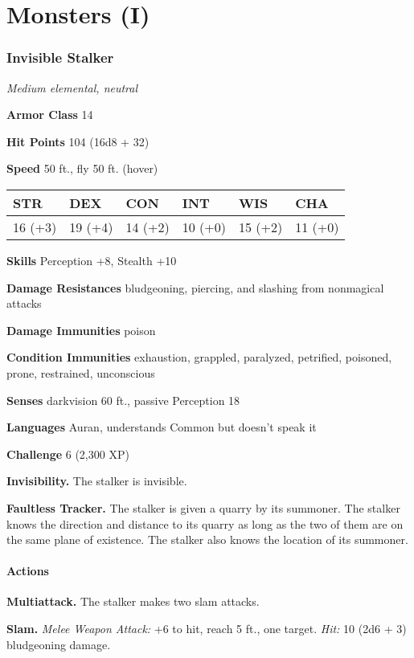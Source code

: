 \documentclass[
]{article}
\date{}
\begin{document}
\hypertarget{monsters-i}{%
\section{Monsters (I)}\label{monsters-i}}

\hypertarget{invisible-stalker}{%
\subsubsection{Invisible Stalker}\label{invisible-stalker}}

\emph{Medium elemental, neutral}

\textbf{Armor Class} 14

\textbf{Hit Points} 104 (16d8 + 32)

\textbf{Speed} 50 ft., fly 50 ft. (hover)

\begin{longtable}[]{@{}llllll@{}}
\toprule
STR & DEX & CON & INT & WIS & CHA\tabularnewline
\midrule
\endhead
16 (+3) & 19 (+4) & 14 (+2) & 10 (+0) & 15 (+2) & 11 (+0)\tabularnewline
\bottomrule
\end{longtable}

\textbf{Skills} Perception +8, Stealth +10

\textbf{Damage Resistances} bludgeoning, piercing, and slashing from
nonmagical attacks

\textbf{Damage Immunities} poison

\textbf{Condition Immunities} exhaustion, grappled, paralyzed,
petrified, poisoned, prone, restrained, unconscious

\textbf{Senses} darkvision 60 ft., passive Perception 18

\textbf{Languages} Auran, understands Common but doesn't speak it

\textbf{Challenge} 6 (2,300 XP)

\textbf{Invisibility.} The stalker is invisible.

\textbf{Faultless Tracker.} The stalker is given a quarry by its
summoner. The stalker knows the direction and distance to its quarry as
long as the two of them are on the same plane of existence. The stalker
also knows the location of its summoner.

\hypertarget{actions}{%
\paragraph{Actions}\label{actions}}

\textbf{Multiattack.} The stalker makes two slam attacks.

\textbf{Slam.} \emph{Melee Weapon Attack:} +6 to hit, reach 5 ft., one
target. \emph{Hit:} 10 (2d6 + 3) bludgeoning damage.
\end{document}
